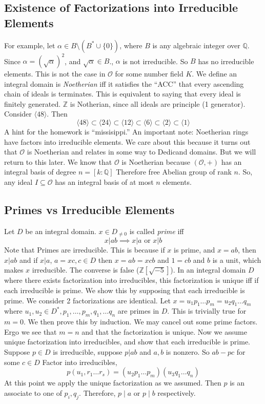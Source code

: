 \documentclass{article}
\begin{document}
\subsection{Existence of Factorizations into Irreducible Elements}
For example, let $\alpha \in B\setminus(B^* \cup \{0\})$, where $B$ is any algebraic integer over
$\mathbb{Q}$. Since $\alpha = {(\sqrt{\alpha})}^2$, and $\sqrt{\alpha} \in B$.,
$\alpha$ is not irreducible. So $B$ has no irreducible elements. This is not the
case in $\mathcal{O}$ for some number field $K$. We define an integral domain is
\emph{Noetherian} iff it satisfies the ``ACC'' that every ascending chain of
ideals is terminates. This is equivalent to saying that every ideal is finitely
generated. $\mathbb{Z}$ is Notherian, since all ideals are principle (1
generator). Consider $\langle 48 \rangle$. Then
\[ \langle 48 \rangle \subset \langle 24 \rangle \subset \langle 12 \rangle \subset
\langle 6 \rangle \subset \langle 2 \rangle \subset \langle 1 \rangle \] 
A hint for the homework is ``missisippi.'' An important note: Noetherian rings
have factors into irreducible elements. We care about this because it turns out
that $\mathcal{O}$ is Noetherian and relates in some way to Dedicand domains.
But we will return to this later. We know that $\mathcal{O}$ is Noetherian
because $(\mathcal{O}, +)$ has an integral basis of degree $n = [k:\mathbb{Q}]$
Therefore free Abelian group of rank $n$. So, any ideal $I \subseteq
\mathcal{O}$ has an integral basis of at most $n$ elements. 

\subsection{Primes vs Irreducible Elements}
Let $D$ be an integral domain. $x \in D_{\neq 0}$ is called \emph{prime} iff
\[ x|ab \implies x|a \text{ or } x|b \]
Note that Primes are irreducible. This is because if $x$ is prime, and $x = ab$,
then $x | ab$ and if $x|a$, $a = xc, c \in D$ then $x = ab  = xcb$ and $1 = cb$
and $b$ is a unit, which makes $x$ irreducible. The converse is false
($\mathbb{Z}[\sqrt{-5}]$). In an integral domain $D$ where there exists
factorization into irreducibles, this factorization is unique iff if each
irreducible is prime. We show this by supposing that each irreducible is
prime. We consider 2 factorizations are identical. Let $x = u_1 p_1 \ldots p_m =
u_2 q_1 \ldots q_m$ where $u_1, u_2 \in D^{*}, p_1,\ldots,p_m,q_1,\ldots q_n$
are primes in $D$. This is trivially true for $m = 0$. We then prove this by
induction. We may cancel out some prime factors. Ergo we see that $m = n$
and that the factorization is unique. Now we assume unique factorization into
irreducibles, and show that each irreducible is prime. Suppose $p\in D$ is
irreducible, suppose $p|ab$ and $a,b$ is nonzero. So $ab - pc$ for some $c \in
D$ Factor into irreducibles, 
\[ p (u_1, r_1\ldots r_s) = (u_2 p_1\ldots p_m)(u_3 q_1 \ldots q_n) \]
At this point we apply the unique factorization as we assumed. Then $p$ is an
associate to one of $p_i, q_j$. Therefore, $p \mid a$ or $p \mid b$
respectively. 
\end{document}

